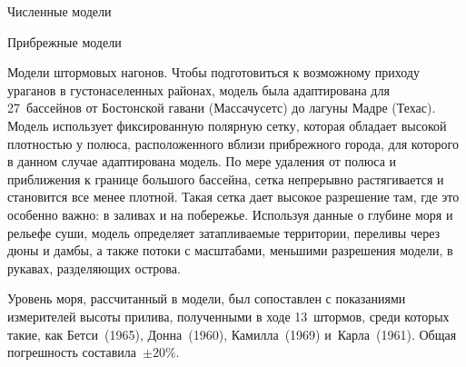 \begin{chapter}{Численные модели}
\begin{section}{Прибрежные модели}
\begin{paragraph}{Модели штормовых нагонов.}
Чтобы подготовиться к возможному приходу ураганов в густонаселенных районах,
модель была адаптирована для 27~бассейнов от Бостонской гавани (Массачусетс)
до лагуны Мадре (Техас). Модель использует фиксированную полярную сетку,
которая обладает высокой плотностью у полюса, расположенного вблизи
прибрежного города, для которого в данном случае адаптирована модель. По мере
удаления от полюса и приближения к границе большого бассейна, сетка непрерывно
растягивается и становится все менее плотной. 
Такая сетка дает высокое разрешение там, где это особенно важно: в заливах и
на побережье. Используя данные о глубине моря и рельефе суши,
модель определяет затапливаемые территории, переливы через дюны и дамбы, 
а также потоки с масштабами, меньшими разрешения модели, в рукавах,
разделяющих острова.
%

Уровень моря, рассчитанный в модели, был сопоставлен с показаниями измерителей
высоты прилива, полученными в ходе 13~штормов, среди которых такие, как
Бетси~(1965), Донна~(1960), Камилла~(1969) и~Карла~(1961). 
Общая погрешность составила~$\pm20\%$.
%


\end{paragraph}
\end{section}
\end{chapter}
